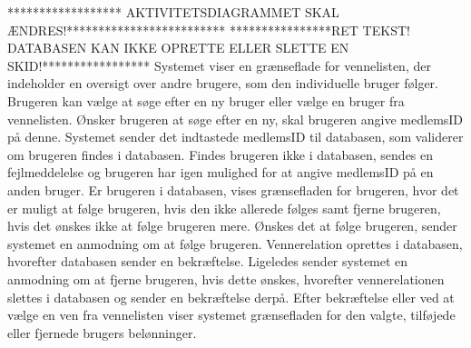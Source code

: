 ****************** AKTIVITETSDIAGRAMMET SKAL ÆNDRES!*************************
****************RET TEKST! DATABASEN KAN IKKE OPRETTE ELLER SLETTE EN SKID!*****************
\noindent
Systemet viser en grænseflade for vennelisten, der indeholder en oversigt over andre brugere, som den individuelle bruger følger. Brugeren kan vælge at søge efter en ny bruger eller vælge en bruger fra vennelisten. Ønsker brugeren at søge efter en ny, skal brugeren angive medlemsID på denne. Systemet sender det indtastede medlemsID til databasen, som validerer om brugeren findes i databasen. Findes brugeren ikke i databasen, sendes en fejlmeddelelse og brugeren har igen mulighed for at angive medlemsID på en anden bruger. Er brugeren i databasen, vises grænsefladen for brugeren, hvor det er muligt at følge brugeren, hvis den ikke allerede følges samt fjerne brugeren, hvis det ønskes ikke at følge brugeren mere. Ønskes det at følge brugeren, sender systemet en anmodning om at følge brugeren. Vennerelation oprettes i databasen, hvorefter databasen sender en bekræftelse. Ligeledes sender systemet en anmodning om at fjerne brugeren, hvis dette ønskes, hvorefter vennerelationen slettes i databasen og sender en bekræftelse derpå. Efter bekræftelse eller ved at vælge en ven fra vennelisten viser systemet grænsefladen for den valgte, tilføjede eller fjernede brugers belønninger.




